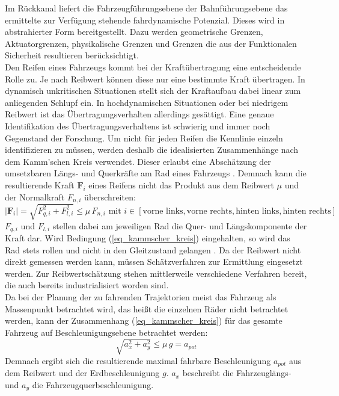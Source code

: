Im Rückkanal liefert die Fahrzeugführungsebene der Bahnführungsebene das ermittelte zur Verfügung stehende fahrdynamische Potenzial.  Dieses wird in abstrahierter Form bereitgestellt. Dazu werden geometrische Grenzen, Aktuatorgrenzen, physikalische Grenzen und Grenzen die aus der Funktionalen Sicherheit resultieren berücksichtigt.\\
Den Reifen eines Fahrzeugs kommt bei der Kraftübertragung eine entscheidende Rolle zu. Je nach Reibwert können diese nur eine bestimmte Kraft übertragen. In dynamisch unkritischen Situationen stellt sich der Kraftaufbau dabei linear zum anliegenden Schlupf ein. In hochdynamischen Situationen oder bei niedrigem Reibwert ist das Übertragungsverhalten allerdings gesättigt. Eine genaue Identifikation des Übertragungsverhaltens ist schwierig und immer noch Gegenstand der Forschung. Um nicht für jeden Reifen die Kennlinie einzeln identifizieren zu müssen, werden deshalb die idealisierten Zusammenhänge nach dem Kamm'schen Kreis verwendet. Dieser erlaubt eine Abschätzung der umsetzbaren Längs- und Querkräfte am Rad eines Fahrzeugs \cite{Risch2002}. Demnach kann die resultierende Kraft $\mathbf{F}_i$ eines Reifens nicht das Produkt aus dem Reibwert $\mu$
und der Normalkraft $F_{n,i}$ überschreiten:
\begin{equation}
|\mathbf{F}_i|= \sqrt{F_{q,i}^2 + F_{l,i} ^2} \leq \mu \, F_{n,i} \text{ mit } i \in [\text{vorne links}, \text{vorne rechts}, \text{hinten links}, \text{hinten rechts}]
\label{eq_kammscher_kreis}
\end{equation}
$F_{q,i}$ und $F_{l,i}$ stellen dabei am jeweiligen Rad die Quer- und Längskomponente der Kraft dar. Wird Bedingung (\ref{eq_kammscher_kreis}) eingehalten, so wird das Rad stets rollen und nicht in den Gleitzustand gelangen \cite{Mitschke2004}.
Da der Reibwert nicht direkt gemessen werden kann, müssen Schätzverfahren zur Ermittlung eingesetzt werden. Zur Reibwertschätzung stehen mittlerweile verschiedene Verfahren bereit, die auch bereits industrialisiert worden sind.\\
Da bei der Planung der zu fahrenden Trajektorien meist das Fahrzeug als Massenpunkt betrachtet wird, das heißt die einzelnen Räder nicht betrachtet werden, kann der Zusammenhang (\ref{eq_kammscher_kreis}) für das gesamte Fahrzeug auf Beschleunigungsebene betrachtet werden:
\begin{equation}
 \sqrt{a_x^2+a_y^2} \leq \mu \, g = a_{pot}
\end{equation}
Demnach ergibt sich die resultierende maximal fahrbare Beschleunigung $a_{pot}$ aus dem Reibwert und der Erdbeschleunigung $g$. $a_x$ beschreibt die Fahrzeuglängs- und $a_y$ die Fahrzeugquerbeschleunigung.
